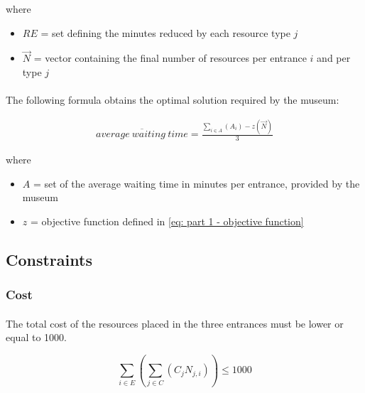 where

\begin{itemize}
    \item[] $RE$ = set defining the minutes reduced by each resource type $j$
    \item[] $\vec{N}$ = vector containing the final number of resources per entrance $i$ and per type $j$
\end{itemize}

\paragraph{}
The following formula obtains the optimal solution required by the museum:

\begin{equation}\label{eq: part 1 - average waiting time in all entrances}
    \begin{aligned}
        \overline {average\ waiting\ time} = \frac{\sum_{i \in A}{\left(A_i\right) - z(\vec{N})}}{3}
    \end{aligned}
\end{equation}

where

\begin{itemize}
    \item[] $A$ = set of the average waiting time in minutes per entrance, provided by the museum
    \item[] $z$ = objective function defined in \ref{eq: part 1 - objective function}
\end{itemize}


\subsection{Constraints}

\subsubsection{Cost}

\paragraph{}
The total cost of the resources placed in the three entrances must be lower or equal to 1000\EUR{}.

\begin{equation}
    \sum_{i \in E}\left({\sum_{j \in C}\left({C_j N_{j,i}}\right)}\right) \leq 1000
\end{equation}

